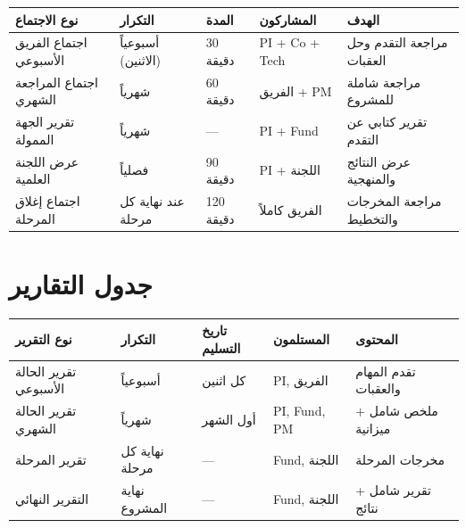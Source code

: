 \documentclass[11pt,a4paper,landscape]{article}
\begin{document}
\begin{table}[H]
\centering
\renewcommand{\arraystretch}{1.5}
\begin{tabularx}{\textwidth}{L{4cm} C{2.5cm} C{2.5cm} L{3cm} X}
\toprule
\textbf{نوع الاجتماع} & \textbf{التكرار} & \textbf{المدة} & \textbf{المشاركون} & \textbf{الهدف} \\
\midrule
اجتماع الفريق الأسبوعي & أسبوعياً (الاثنين) & 30 دقيقة & PI + Co + Tech & مراجعة التقدم وحل العقبات \\
\midrule
اجتماع المراجعة الشهري & شهرياً & 60 دقيقة & الفريق + PM & مراجعة شاملة للمشروع \\
\midrule
تقرير الجهة الممولة & شهرياً & --- & PI + Fund & تقرير كتابي عن التقدم \\
\midrule
عرض اللجنة العلمية & فصلياً & 90 دقيقة & PI + اللجنة & عرض النتائج والمنهجية \\
\midrule
اجتماع إغلاق المرحلة & عند نهاية كل مرحلة & 120 دقيقة & الفريق كاملاً & مراجعة المخرجات والتخطيط \\
\bottomrule
\end{tabularx}
\end{table}

\section{جدول التقارير}
\label{sec:reporting}

\begin{table}[H]
\centering
\renewcommand{\arraystretch}{1.5}
\begin{tabularx}{\textwidth}{L{4cm} C{2.5cm} C{2.5cm} L{4cm} X}
\toprule
\textbf{نوع التقرير} & \textbf{التكرار} & \textbf{تاريخ التسليم} & \textbf{المستلمون} & \textbf{المحتوى} \\
\midrule
تقرير الحالة الأسبوعي & أسبوعياً & كل اثنين & PI, الفريق & تقدم المهام والعقبات \\
\midrule
تقرير الحالة الشهري & شهرياً & أول الشهر & PI, Fund, PM & ملخص شامل + ميزانية \\
\midrule
تقرير المرحلة & نهاية كل مرحلة & --- & Fund, اللجنة & مخرجات المرحلة \\
\midrule
التقرير النهائي & نهاية المشروع & --- & Fund, اللجنة & تقرير شامل + نتائج \\
\bottomrule
\end{tabularx}
\end{table}
\end{document}
